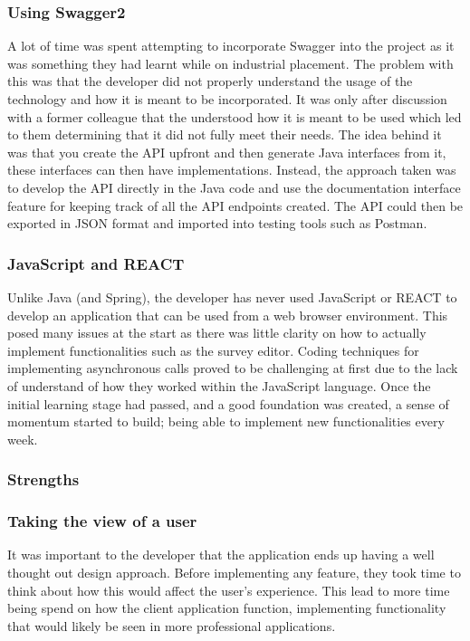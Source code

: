 \subsubsection*{Using Swagger2}
A lot of time was spent attempting to incorporate Swagger into the project as it was something they had learnt while on industrial placement.
The problem with this was that the developer did not properly understand the usage of the technology and how it is meant to be incorporated.
It was only after discussion with a former colleague that the understood how it is meant to be used which led to them determining that it did 
not fully meet their needs. 
The idea behind it was that you create the API upfront and then generate Java interfaces from it, these interfaces can then have implementations.
Instead, the approach taken was to develop the API directly in the Java code and use the documentation interface feature for keeping track of
all the API endpoints created.
The API could then be exported in JSON format and imported into testing tools such as Postman.

\subsubsection*{JavaScript and REACT}

Unlike Java (and Spring), the developer has never used JavaScript or REACT to develop an application that can be used from a web browser 
environment.
This posed many issues at the start as there was little clarity on how to actually implement functionalities such as the survey editor.
Coding techniques for implementing asynchronous calls proved to be challenging at first due to the lack of understand of how they worked within the 
JavaScript language.
Once the initial learning stage had passed, and a good foundation was created, a sense of momentum started to build; being able to implement new 
functionalities every week.


\subsubsection{Strengths}

\subsubsection*{Taking the view of a user}
It was important to the developer that the application ends up having a well thought out design approach.
Before implementing any feature, they took time to think about how this would affect the user's experience. 
This lead to more time being spend on how the client application function, implementing functionality that would likely be seen in more professional
applications.

